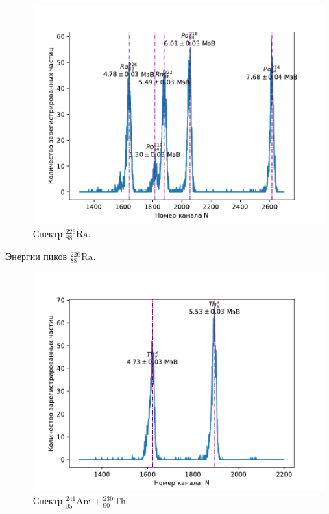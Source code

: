 \documentclass[10pt,a4paper]{article}
\newcommand{\elem}[3]{{}^{#2}_{#3}\text{#1}}
\newcommand{\Ra}{\elem{Ra}{226}{88}}
\newcommand{\Th}{\elem{Th}{230}{90}}
\newcommand{\Am}{\elem{Am}{241}{95}}
\begin{document}
\begin{multicols}{2}
	\begin{figure}[H]
		\includegraphics[width=1\textwidth]{gen/fig-ra.pdf}
		\caption{Спектр $\Ra$.}
		\label{fig:ra}
	\end{figure}

	\vspace*{-1cm}
	
	\begin{table}[H]
		\addtolength{\tabcolsep}{-4pt}
		\footnotesize
		
		\caption{Энергии пиков $\Ra$.}
		\label{tab:term}
	\end{table}
	
	\vspace*{-1cm}
	
	\begin{figure}[H]
		\includegraphics[width=1\textwidth]{gen/fig-th_am.pdf}
		\caption{Спектр $\Am + \Th$.}
		\label{fig:th_am}
	\end{figure}
	

\end{multicols}
\end{document}
